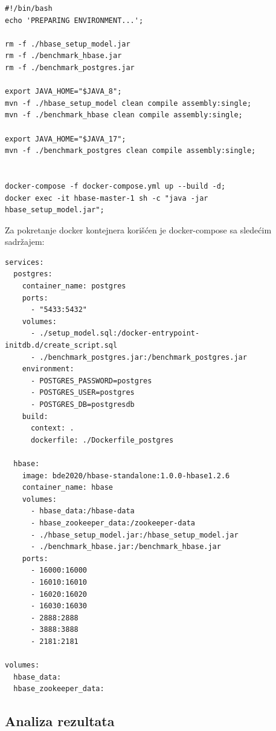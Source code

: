 \documentclass[12pt,oneside]{memoir}
\begin{document}

\begin{lstlisting}[title={prepareEnv.sh},captionpos=t]
#!/bin/bash
echo 'PREPARING ENVIRONMENT...';

rm -f ./hbase_setup_model.jar
rm -f ./benchmark_hbase.jar
rm -f ./benchmark_postgres.jar

export JAVA_HOME="$JAVA_8";
mvn -f ./hbase_setup_model clean compile assembly:single;
mvn -f ./benchmark_hbase clean compile assembly:single;

export JAVA_HOME="$JAVA_17";
mvn -f ./benchmark_postgres clean compile assembly:single;


docker-compose -f docker-compose.yml up --build -d;
docker exec -it hbase-master-1 sh -c "java -jar hbase_setup_model.jar";

\end{lstlisting}

 Za pokretanje docker kontejnera korišćen je docker-compose sa sledećim sadržajem:


\begin{lstlisting}[title={docker-compose.yml},captionpos=t]
services: 
  postgres:
    container_name: postgres
    ports:
      - "5433:5432"
    volumes:
      - ./setup_model.sql:/docker-entrypoint-initdb.d/create_script.sql
      - ./benchmark_postgres.jar:/benchmark_postgres.jar
    environment:
      - POSTGRES_PASSWORD=postgres
      - POSTGRES_USER=postgres
      - POSTGRES_DB=postgresdb
    build:
      context: .
      dockerfile: ./Dockerfile_postgres

  hbase:
    image: bde2020/hbase-standalone:1.0.0-hbase1.2.6
    container_name: hbase
    volumes:
      - hbase_data:/hbase-data
      - hbase_zookeeper_data:/zookeeper-data
      - ./hbase_setup_model.jar:/hbase_setup_model.jar
      - ./benchmark_hbase.jar:/benchmark_hbase.jar
    ports:
      - 16000:16000
      - 16010:16010
      - 16020:16020
      - 16030:16030
      - 2888:2888
      - 3888:3888
      - 2181:2181

volumes:
  hbase_data:
  hbase_zookeeper_data:
\end{lstlisting}


\subsection{Analiza rezultata}
\end{document}
